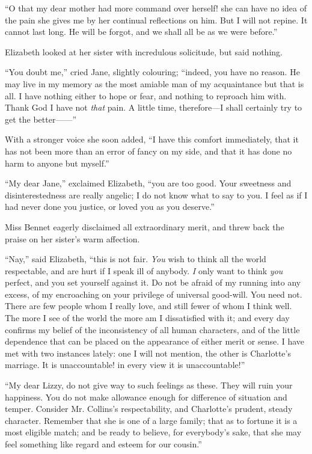 \documentclass[12pt]{book}
\begin{document}
``O that my dear mother had more command over herself! she can have no idea of the pain she gives me by her continual reflections on him. But I will not repine. It cannot last long. He will be forgot, and we shall all be as we were before.''

Elizabeth looked at her sister with incredulous solicitude, but said nothing.

``You doubt me,'' cried Jane, slightly colouring; ``indeed, you have no reason. He may live in my memory as the most amiable man of my acquaintance but that is all. I have nothing either to hope or fear, and nothing to reproach him with. Thank God I have not \textit{that} pain. A little time, therefore---I shall certainly try to get the better------''

With a stronger voice she soon added, ``I have this comfort immediately, that it has not been more than an error of fancy on my side, and that it has done no harm to anyone but myself.''

``My dear Jane,'' exclaimed Elizabeth, ``you are too good. Your sweetness and disinterestedness are really angelic; I do not know what to say to you. I feel as if I had never done you justice, or loved you as you deserve.''

Miss Bennet eagerly disclaimed all extraordinary merit, and threw back the praise on her sister's warm affection.

``Nay,'' said Elizabeth, ``this is not fair. \textit{You} wish to think all the world respectable, and are hurt if I speak ill of anybody. \textit{I} only want to think \textit{you} perfect, and you set yourself against it. Do not be afraid of my running into any excess, of my encroaching on your privilege of universal good-will. You need not. There are few people whom I really love, and still fewer of whom I think well. The more I see of the world the more am I dissatisfied with it; and every day confirms my belief of the inconsistency of all human characters, and of the little dependence that can be placed on the appearance of either merit or sense. I have met with two instances lately: one I will not mention, the other is Charlotte's marriage. It is unaccountable! in every view it is unaccountable!''

``My dear Lizzy, do not give way to such feelings as these. They will ruin your happiness. You do not make allowance enough for difference of situation and temper. Consider Mr. Collins's respectability, and Charlotte's prudent, steady character. Remember that she is one of a large family; that as to fortune it is a most eligible match; and be ready to believe, for everybody's sake, that she may feel something like regard and esteem for our cousin.''
\end{document}
